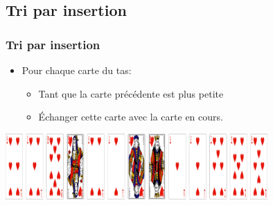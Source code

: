 \documentclass[svgnames,11pt]{beamer}
\begin{document}
\subsection{Tri par insertion}
\begin{frame}
    \frametitle{Tri par insertion}

    \begin{itemize}
        \item Pour chaque carte du tas:
              \begin{itemize}
                  \item Tant que la carte précédente est plus petite
                  \item Échanger cette carte avec la carte en cours.
              \end{itemize}

    \end{itemize}

\end{frame}
\begin{frame}

    \begin{center}
        \centering
        \includegraphics[width=10cm]{ressources/jeu-coeur-melange.png}
        \end{center}
        \begin{center}
        \end{center}

\end{frame}
\end{document}
